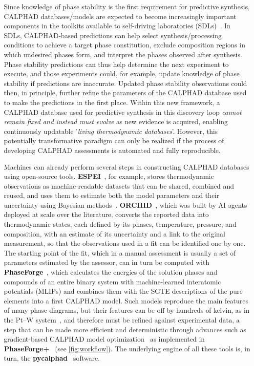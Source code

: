 Since knowledge of phase stability is the first requirement for predictive synthesis, CALPHAD databases/models are expected to become increasingly important components in the toolkits available to self-driving laboratories (SDLs)~\cite{abolhasani2023selfdriving,szymanski2023alab}. In SDLs, CALPHAD-based predictions can help select synthesis/processing conditions to achieve a target phase constitution, exclude composition regions in which undesired phases form, and interpret the phases observed after synthesis. Phase stability predictions can thus help determine the next experiment to execute, and those experiments could, for example, update knowledge of phase stability if predictions are inaccurate. Updated phase stability observations could then, in principle, further refine the parameters of the CALPHAD database used to make the predictions in the first place. Within this new framework, a CALPHAD database used for predictive synthesis in this discovery loop \emph{cannot remain fixed and instead must evolve} as new evidence is acquired, enabling continuously updatable '\emph{living thermodynamic databases}'. However, this potentially transformative paradigm can only be realized if the process of developing CALPHAD assessments is automated and fully reproducible.

Machines can already perform several steps in constructing CALPHAD databases using open-source tools. \textbf{ESPEI}~\cite{bocklund2019espei}, for example, stores thermodynamic observations as machine-readable datasets that can be shared, combined and reused, and uses them to estimate both the model parameters and their uncertainty using Bayesian methods~\cite{honarmandi2019bayesian}. \textbf{ORCHID}~\cite{arroyave2026orchid}, which was built by AI agents deployed at scale over the literature, converts the reported data into thermodynamic states, each defined by its phases, temperature, pressure, and composition, with an estimate of its uncertainty and a link to the original measurement, so that the observations used in a fit can be identified one by one. The starting point of the fit, which in a manual assessment is usually a set of parameters estimated by the assessor, can in turn be computed with \textbf{PhaseForge}~\cite{zhu2025accelerating,zhu2025machinelearningpotentialsalloys}, which calculates the energies of the solution phases and compounds of an entire binary system with machine-learned interatomic potentials (MLIPs) and combines them with the SGTE descriptions of the pure elements into a first CALPHAD model. Such models reproduce the main features of many phase diagrams, but their features can be off by hundreds of kelvin, as in the Pt--W system~\cite{kunselman2025ptw}, and therefore must be refined against experimental data, a step that can be made more efficient and deterministic through advances such as gradient-based CALPHAD model optimization~\cite{kunselman2024analytically,kunselman2025analytical} as implemented in \textbf{PhaseForge+}~\cite{kunselman2025ptw,sariturk2025phaseforgeplus} (see \cref{fig:workflow}). The underlying engine of all these tools is, in turn, the \textbf{pycalphad}~\cite{otis2017pycalphad} software.

